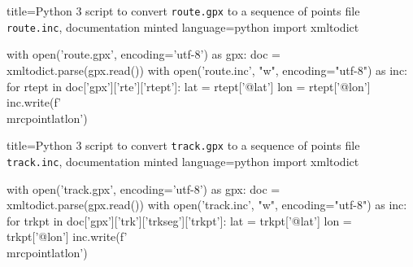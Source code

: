 \begin{dispListing*}{title=Python 3 script to convert \texttt{route.gpx} to
  a sequence of points file \texttt{route.inc},
  documentation minted language=python}
import xmltodict

with open('route.gpx', encoding='utf-8') as gpx:
    doc = xmltodict.parse(gpx.read())
    with open('route.inc', "w", encoding="utf-8") as inc:
        for rtept in doc['gpx']['rte']['rtept']:
            lat = rtept['@lat']
            lon = rtept['@lon']
            inc.write(f'\\mrcpoint{{{lat}}}{{{lon}}}\n')
\end{dispListing*}


\begin{dispListing*}{title=Python 3 script to convert \texttt{track.gpx} to
  a sequence of points file \texttt{track.inc},
  documentation minted language=python}
import xmltodict

with open('track.gpx', encoding='utf-8') as gpx:
    doc = xmltodict.parse(gpx.read())
    with open('track.inc', "w", encoding="utf-8") as inc:
        for trkpt in doc['gpx']['trk']['trkseg']['trkpt']:
            lat = trkpt['@lat']
            lon = trkpt['@lon']
            inc.write(f'\\mrcpoint{{{lat}}}{{{lon}}}\n')
\end{dispListing*}

